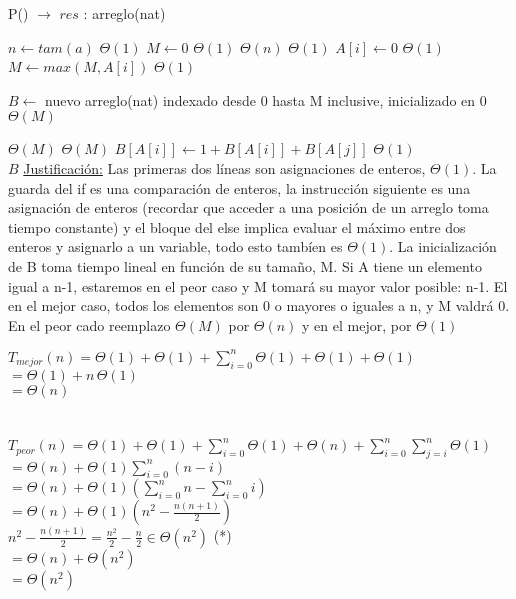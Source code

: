 \documentclass[10pt, a4paper]{article}
\begin{document}
	
\begin{algorithm}[H]{P() $\to$ $res$ : arreglo(nat)}	
	\begin{algorithmic}[1]
			 \State $n \gets tam(a)$			\Comment $\Theta(1)$
			 \State $M \gets 0$					\Comment $\Theta(1)$
			 			\Comment $\Theta(n)$
			 					\Comment $\Theta(1)$
			 		\State $A[i]\gets 0$			\Comment $\Theta(1)$
			 	\Else
			 		\State $M\gets max(M, A[i])$	\Comment $\Theta(1)$
			 	\EndIf
			 \EndFor
			 
			 \State $B \gets$ nuevo arreglo(nat) indexado desde 0 hasta M inclusive, inicializado en 0		\Comment $\Theta(M)$
    	
    						\Comment $\Theta(M)$
    						\Comment $\Theta(M)$
			 		\State $B[A[i]]\gets 1 + B[A[i]] + B[A[j]]$	\Comment $\Theta(1)$
			 	\EndFor
			\EndFor \\
			\Return $B$
		\medskip
		\Statex \underline{Justificación:} Las primeras dos líneas son asignaciones de enteros, $\Theta(1)$. La guarda del if es una comparación de enteros, la instrucción siguiente es una asignación de enteros (recordar que acceder a una posición de un arreglo toma tiempo constante) y el bloque del else implica evaluar el máximo entre dos enteros y asignarlo a un variable, todo esto tambíen es $\Theta(1)$. La inicialización de B toma tiempo lineal en función de su tamaño, M.
		Si A tiene un elemento igual a n-1, estaremos en el peor caso y M tomará su mayor valor posible: n-1. El en el mejor caso, todos los elementos son 0 o mayores o iguales a n, y M valdrá 0. En el peor cado reemplazo $\Theta(M)$ por $\Theta(n)$ y en el mejor, por $\Theta(1)$
    \end{algorithmic}
\end{algorithm}	

$T_{mejor}(n) = \Theta (1) + \Theta (1) + \sum_{i=0}^{n} \Theta (1) +\Theta (1) + \Theta (1)$\\
 $= \Theta (1) + n \, \Theta (1)$\\
 $= \Theta (n)$\\ \\ \\
 
$T_{peor}(n) = \Theta (1) + \Theta (1) + \sum_{i=0}^{n} \Theta (1) +\Theta (n) + \sum_{i=0}^{n} \sum_{j=i}^{n} \Theta (1)$\\
$= \Theta (n) +\Theta (1) \sum_{i=0}^{n}(n-i)$ \\
$= \Theta (n) +\Theta (1) (\sum_{i=0}^{n}n - \sum_{i=0}^{n}i)$\\
$= \Theta (n) +\Theta (1) (n^2 - \frac{n(n+1)}{2})$\\
$n^2 - \frac{n(n+1)}{2} = \frac{n^2}{2} - \frac{n}{2} \in \Theta (n^2)$ (*)\\
$= \Theta (n) +\Theta (n^2)$\\
$=\Theta (n^2)$\\ \\
\end{document}
